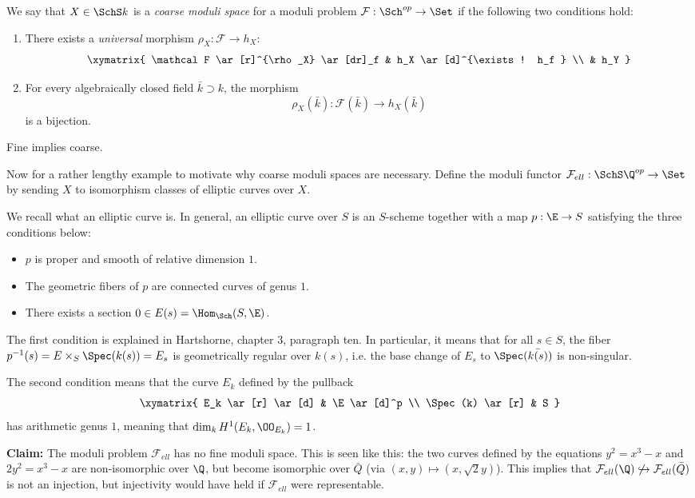 \documentclass[11pt, english]{article}
\begin{document}
\begin{defi}
We say that $X \in \SchS k$ is a \emph{coarse moduli space} for a moduli problem $\mathcal F :\Sch^{op} \to \Set$ if the following two conditions hold:
\begin{enumerate}
\item There exists a \emph{universal} morphism $\rho_X : \mathcal{F} \to h_X$:
\[
\xymatrix{
\mathcal F \ar[r]^{\rho_X} \ar[dr]_f & h_X \ar[d]^{\exists ! h_f } \\
 & h_Y
}
\]
\item
For every algebraically closed field $\bar{k} \supset k$, the morphism
\[
\rho_X(\bar{k}):\mathcal F (\bar k) \to h_X(\bar k)
\]
is a bijection.
\end{enumerate}
\end{defi}

\begin{remark} Fine implies coarse. \end{remark}

Now for a rather lengthy example to motivate why coarse moduli spaces are necessary. Define the moduli functor $\mathcal F_{ell}:\SchS \Q^{op} \to \Set$ by sending $X$ to isomorphism classes of elliptic curves over $X$.

We recall what an elliptic curve is. In general, an elliptic curve over $S$ is an $S$-scheme together with a map $p:\E \to S$ satisfying the three conditions below:
\begin{itemize}
\item $p$ is proper and smooth of relative dimension $1$.
\item The geometric fibers of $p$ are connected curves of genus $1$.
\item There exists a section $0 \in E(s) = \Hom_\Sch(S,\E)$.
\end{itemize}
The first condition is explained in Hartshorne, chapter 3, paragraph ten. In particular, it means that for all $s \in S$, the fiber $p^{-1}(s)=E \times_S \Spec(k(s)) = E_s$ is geometrically regular over $k(s)$, i.e. the base change of $E_s$ to $\Spec (\bar{k(s)})$ is non-singular.

The second condition means that the curve $E_k$ defined by the pullback 
\[
\xymatrix{
E_k \ar[r] \ar[d] & \E \ar[d]^p \\
\Spec(k) \ar[r] & S
}
\]
has arithmetic genus $1$, meaning that $\dim_k H^1(E_k, \OO_{E_k}) = 1$.

\textbf{Claim:} The moduli problem $\mathcal F_{ell}$ has no fine moduli space. This is seen like this: the two curves defined by the equations $y^2=x^3-x$ and $2y^2=x^3-x$ are non-isomorphic over $\Q$, but become isomorphic over $\bar Q$ (via $(x,y) \mapsto (x,\sqrt{2}y)$). This implies that $\mathcal F_{ell} (\Q) \not \hookrightarrow \mathcal F_{ell} (\bar Q)$ is not an injection, but injectivity would have held if $\mathcal F_{ell}$ were representable.
\end{document}
